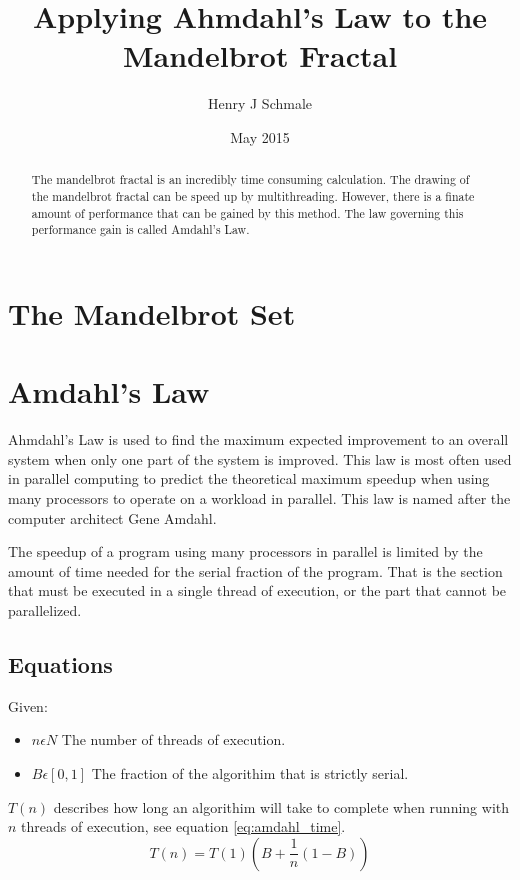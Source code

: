 \documentclass[10pt,oneside,letter]{article}
\begin{document}
\title{Applying Ahmdahl's Law to the Mandelbrot Fractal}
\author{Henry J Schmale}
\date{May 2015}
\maketitle

\begin{abstract}
The mandelbrot fractal is an incredibly time consuming calculation.
The drawing of the mandelbrot fractal can be speed up by multithreading.
However, there is a finate amount of performance that can be gained by
this method. The law governing this performance gain is called Amdahl's
Law.
\end{abstract}

\section{The Mandelbrot Set}

\section{Amdahl's Law}
Ahmdahl's Law is used to find the maximum expected improvement to an overall
system when only one part of the system is improved. This law is most often
used in parallel computing to predict the theoretical maximum speedup when
using many processors to operate on a workload in parallel. This law is named
after the computer architect Gene Amdahl.

The speedup of a program using many processors in parallel is limited by the
amount of time needed for the serial fraction of the program. That is the
section that must be executed in a single thread of execution, or the part
that cannot be parallelized.

\subsection{Equations}
Given:
\begin{itemize}
  \item $n \epsilon N$ The number of threads of execution.
  \item $B \epsilon [0,1]$ The fraction of the algorithim that is strictly serial.
\end{itemize}

$T(n)$ describes how long an algorithim will take to complete when running
with $n$ threads of execution, see equation \eqref{eq:amdahl_time}.
\begin{equation} \label{eq:amdahl_time}
    T(n) = T(1)(B + \frac{1}{n}(1-B))
\end{equation}
\end{document}

